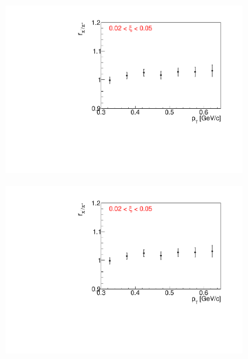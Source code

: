 \begin{figure}[h!]
	\centering
	\begin{subfigure}{.32\textwidth}
		\includegraphics[width=\linewidth, page=3]{chapters/chrgSTAR/img/dEdx/fit2019_fitResult_1_0_step_0.pdf}
	\end{subfigure}
	\begin{subfigure}{.32\textwidth}
		\includegraphics[width=\linewidth, page=4]{chapters/chrgSTAR/img/dEdx/fit2019_fitResult_1_0_step_0.pdf}
	\end{subfigure}
	\begin{subfigure}{.32\textwidth}

\end{subfigure}
\end{figure}
